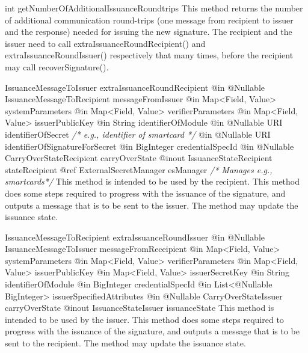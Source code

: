       \begin{getter}
      {int}
      {getNumberOfAdditionalIssuanceRoundtrips}
      This method returns the number of additional communication round-trips
      (one message from recipient to issuer and the response) needed for
      issuing the new signature.
      The recipient and the issuer need to call extraIssuanceRoundRecipient() and
      extraIssuanceRoundIssuer() respectively that many times, before the recipient may
      call recoverSignature().
      \end{getter}
      \begin{method}
      {IssuanceMessageToIssuer}
      {extraIssuanceRoundRecipient}
      {
        {@in @Nullable IssuanceMessageToRecipient messageFromIssuer}
        {@in Map<Field, Value> systemParameters}
        {@in Map<Field, Value> verifierParameters}
        {@in Map<Field, Value> issuerPublicKey}
        {@in String identifierOfModule}
        {@in @Nullable URI identifierOfSecret \textrm{\emph{/* e.g., identifier of smartcard */}}}
        {@in @Nullable URI identifierOfSignatureForSecret}
        {@in BigInteger credentialSpecId}
        {@in @Nullable CarryOverStateRecipient carryOverState}
        {@inout IssuanceStateRecipient stateRecipient}
        {@ref ExternalSecretManager esManager \textrm{\emph{/* Manages e.g., smartcards*/}}}
      }
      This method is intended to be used by the recipient.
      This method does some steps required to progress with the issuance of the signature,
      and outputs a message that is to be sent to the issuer.
      The method may update the issuance state.
      \end{method}
      \begin{method}
      {IssuanceMessageToRecipient}
      {extraIssuanceRoundIssuer}
      {
        {@in @Nullable IssuanceMessageToIssuer messageFromReceipient}
        {@in Map<Field, Value> systemParameters}
        {@in Map<Field, Value> verifierParameters}
        {@in Map<Field, Value> issuerPublicKey}
        {@in Map<Field, Value> issuerSecretKey}
        {@in String identifierOfModule}
        {@in BigInteger credentialSpecId}
        {@in List<@Nullable BigInteger> issuerSpecifiedAttributes}
        {@in @Nullable CarryOverStateIssuer carryOverState}
        {@inout IssuanceStateIssuer issuanceState}
      }
      This method is intended to be used by the issuer.
      This method does some steps required to progress with the issuance of the signature,
      and outputs a message that is to be sent to the recipient.
      The method may update the issuance state.
      \end{method}
